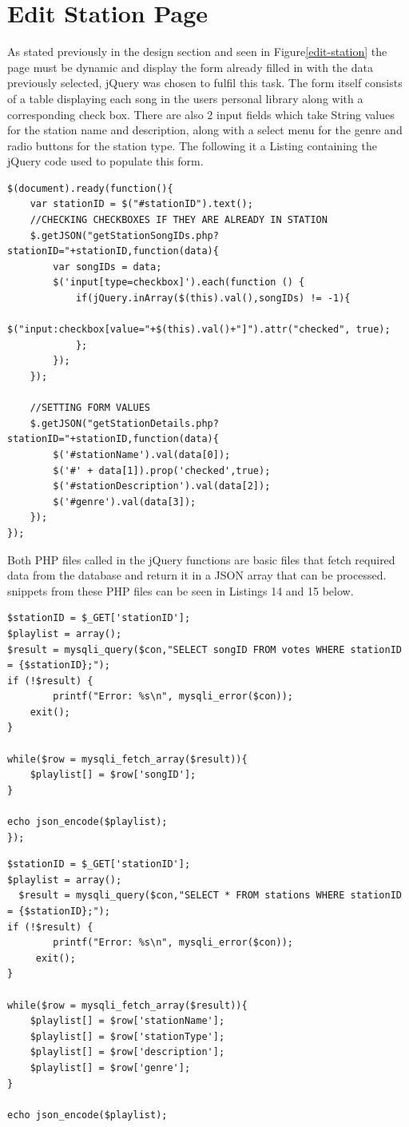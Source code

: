\documentclass[a4paper, 12pt]{report}
\begin{document}
\section{Edit Station Page}
As stated previously in the design section and seen in Figure\ref{edit-station} the page must be dynamic and display the form already filled in with the data previously selected, jQuery was chosen to fulfil this task. 
The form itself consists of a table displaying each song in the users personal library along with a corresponding check box. There are also 2 input fields which take String values for the station name and description, along with a select menu for the genre and radio buttons for the station type. The following it a Listing containing the jQuery code used to populate this form.\\
\begin{lstlisting}[caption=Populate edit library form]
$(document).ready(function(){
	var stationID = $("#stationID").text();
	//CHECKING CHECKBOXES IF THEY ARE ALREADY IN STATION
	$.getJSON("getStationSongIDs.php?stationID="+stationID,function(data){
		var songIDs = data;
		$('input[type=checkbox]').each(function () {
			if(jQuery.inArray($(this).val(),songIDs) != -1){
				$("input:checkbox[value="+$(this).val()+"]").attr("checked", true);
			};		
		});
	});
						
	//SETTING FORM VALUES 
	$.getJSON("getStationDetails.php?stationID="+stationID,function(data){
		$('#stationName').val(data[0]);
		$('#' + data[1]).prop('checked',true);
		$('#stationDescription').val(data[2]);
		$('#genre').val(data[3]);				
	});
}); 
\end{lstlisting}
Both PHP files called in the jQuery functions are basic files that fetch required data from the database and return it in a JSON array that can be processed. snippets from these PHP files can be seen in Listings 14 and 15 below.\\
\begin{lstlisting}[caption=Snippet of code from getStationSongIDs.php]
$stationID = $_GET['stationID'];
$playlist = array();
$result = mysqli_query($con,"SELECT songID FROM votes WHERE stationID = {$stationID};");
if (!$result) {
    	printf("Error: %s\n", mysqli_error($con));
	exit();	
}
	
while($row = mysqli_fetch_array($result)){
	$playlist[] = $row['songID'];
}

echo json_encode($playlist);
}); 
\end{lstlisting}
\begin{lstlisting}[caption=snippet of code from getStationDetails.php]
$stationID = $_GET['stationID'];
$playlist = array();
  $result = mysqli_query($con,"SELECT * FROM stations WHERE stationID = {$stationID};");
if (!$result) {
    	printf("Error: %s\n", mysqli_error($con));
   	 exit();	
}
	
while($row = mysqli_fetch_array($result)){
	$playlist[] = $row['stationName'];
	$playlist[] = $row['stationType'];
	$playlist[] = $row['description'];
	$playlist[] = $row['genre'];
}

echo json_encode($playlist);
\end{lstlisting}
\end{document}
